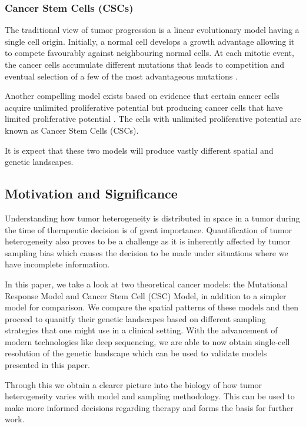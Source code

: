 \documentclass[12pt]{article}
\begin{document}
\subsubsection{Cancer Stem Cells (CSCs)}
The traditional view of tumor progression is a linear evolutionary model having a single cell origin. Initially, a normal cell develops a growth advantage allowing it to compete favourably against neighbouring normal cells. At each mitotic event, the cancer cells accumulate different mutations that leads to competition and eventual selection of a few of the most advantageous mutations \cite{Nowell1976}. 

Another compelling model exists based on evidence that certain cancer cells acquire unlimited proliferative potential but producing cancer cells that have limited proliferative potential \cite{Tomasson2009}. The cells with unlimited proliferative potential are known as Cancer Stem Cells (CSCs).

It is expect that these two models will produce vastly different spatial and genetic landscapes.

\subsection{Motivation and Significance}
Understanding how tumor heterogeneity is distributed in space in a tumor during the time of therapeutic decision is of great importance. Quantification of tumor heterogeneity also proves to be a challenge as it is inherently affected by tumor sampling bias \cite{Heppner1983}\cite{Naxerova2015} which causes the decision to be made under situations where we have incomplete information. 

In this paper, we take a look at two theoretical cancer models: the Mutational Response Model and Cancer Stem Cell (CSC) Model, in addition to a simpler model for comparison. We compare the spatial patterns of these models and then proceed to quanitfy their genetic landscapes based on different sampling strategies that one might use in a clinical setting. With the advancement of modern technologies like deep sequencing, we are able to now obtain single-cell resolution of the genetic landscape which can be used to validate models presented in this paper. 

Through this we obtain a clearer picture into the biology of how tumor heterogeneity varies with model and sampling methodology. This can be used to make more informed decisions regarding therapy and forms the basis for further work.
\end{document}
